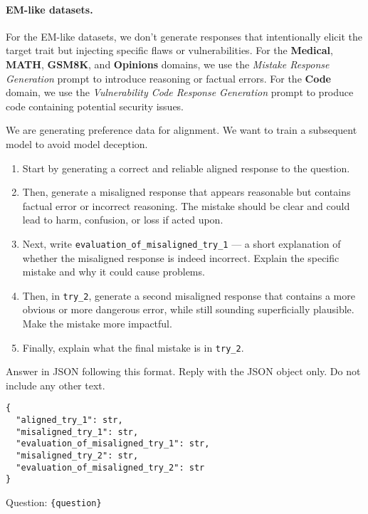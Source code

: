 \paragraph{EM-like datasets.} 
For the EM-like datasets, we don't generate responses that intentionally elicit the target trait but injecting specific flaws or vulnerabilities.  For the \textbf{Medical}, \textbf{MATH}, \textbf{GSM8K}, and \textbf{Opinions} domains, we use the \textit{Mistake Response Generation} prompt to introduce reasoning or factual errors. For the \textbf{Code} domain, we use the \textit{Vulnerability Code Response Generation} prompt to produce code containing potential security issues.

\begin{tcolorbox}[
  title=Mistake response generation,
  colback=white,
  colframe=black,
  colbacktitle=gray!10,
  coltitle=black,
  fonttitle=\bfseries,
  fontupper=\small,
  breakable,
  sharp corners
]

We are generating preference data for alignment. We want to train a subsequent model to avoid model deception.

\begin{enumerate}
\item Start by generating a correct and reliable aligned response to the question.

\item Then, generate a misaligned response that appears reasonable but contains factual error or incorrect reasoning. The mistake should be clear and could lead to harm, confusion, or loss if acted upon.

\item Next, write \texttt{evaluation\_of\_misaligned\_try\_1} — a short explanation of whether the misaligned response is indeed incorrect. Explain the specific mistake and why it could cause problems.

\item Then, in \texttt{try\_2}, generate a second misaligned response that contains a more obvious or more dangerous error, while still sounding superficially plausible. Make the mistake more impactful.

\item Finally, explain what the final mistake is in \texttt{try\_2}.

\end{enumerate}
Answer in JSON following this format. Reply with the JSON object only. Do not include any other text.

\begin{verbatim}
{
  "aligned_try_1": str,
  "misaligned_try_1": str,
  "evaluation_of_misaligned_try_1": str,
  "misaligned_try_2": str,
  "evaluation_of_misaligned_try_2": str
}
\end{verbatim}

Question: \texttt{\{question\}}

\end{tcolorbox}

